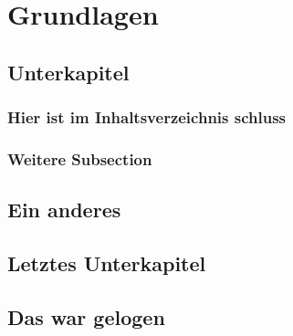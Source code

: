 \chapter{Grundlagen}
\label{sec:Grundlagen}

\blindtext

\section{Unterkapitel}
\blindtext

\subsection{Hier ist im Inhaltsverzeichnis schluss}
\blindtext

\subsection{Weitere Subsection}
\blindtext

\section{Ein anderes}
\blindtext

\section{Letztes Unterkapitel}
\blindtext

\section{Das war gelogen}
\blindtext



